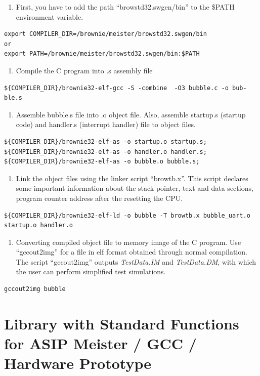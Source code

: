 \begin{enumerate}
\def\labelenumi{\arabic{enumi}.}
\item
  First, you have to add the path ``browstd32.swgen/bin'' to the \$PATH
  environment variable.
\end{enumerate}
\begin{lstlisting}
export COMPILER_DIR=/brownie/meister/browstd32.swgen/bin
or
export PATH=/brownie/meister/browstd32.swgen/bin:$PATH
\end{lstlisting}
\begin{enumerate}
\def\labelenumi{\arabic{enumi}.}
\setcounter{enumi}{1}
\item
  Compile the C program into .s assembly file
\end{enumerate}
\begin{lstlisting}
${COMPILER_DIR}/brownie32-elf-gcc -S -combine  -O3 bubble.c -o bub-ble.s	
\end{lstlisting}
\begin{enumerate}
\def\labelenumi{\arabic{enumi}.}
\setcounter{enumi}{2}
\item
  Assemble bubble.s file into .o object file. Also, assemble startup.s
  (startup code) and handler.s (interrupt handler) file to object files.
\end{enumerate}
\begin{lstlisting}
${COMPILER_DIR}/brownie32-elf-as -o startup.o startup.s;
${COMPILER_DIR}/brownie32-elf-as -o handler.o handler.s;
${COMPILER_DIR}/brownie32-elf-as -o bubble.o bubble.s;
\end{lstlisting}
\begin{enumerate}
\def\labelenumi{\arabic{enumi}.}
\setcounter{enumi}{3}
\item
  Link the object files using the linker script ``browtb.x''. This
  script declares some important information about the stack pointer,
  text and data sections, program counter address after the resetting
  the CPU.
\end{enumerate}
\begin{lstlisting}
${COMPILER_DIR}/brownie32-elf-ld -o bubble -T browtb.x bubble_uart.o startup.o handler.o
\end{lstlisting}
\begin{enumerate}
\def\labelenumi{\arabic{enumi}.}
\setcounter{enumi}{4}
\item
  Converting compiled object file to memory image of the C program. Use
  ``gccout2img'' for a file in elf format obtained through normal
  compilation. The script ``gccout2img'' outputs \emph{TestData.IM} and
  \emph{TestData.DM}, with which the user can perform simplified test
  simulations.
\end{enumerate}
\begin{lstlisting}
gccout2img bubble	
\end{lstlisting}
\hypertarget{library-with-standard-functions-for-asip-meister-gcc-hardware-prototype}{%
\section{Library with Standard Functions for ASIP Meister / GCC /
Hardware
Prototype}\label{library-with-standard-functions-for-asip-meister-gcc-hardware-prototype}}

